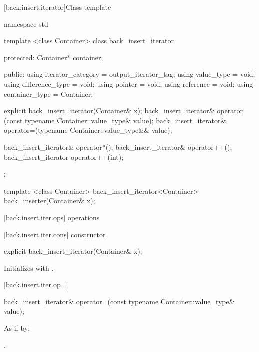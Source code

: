 [back.insert.iterator]{Class template }

%
\begin{codeblock}
namespace std {
  template <class Container>
  class back_insert_iterator {
  protected:
    Container* container;

  public:
    using iterator_category = output_iterator_tag;
    using value_type        = void;
    using difference_type   = void;
    using pointer           = void;
    using reference         = void;
    using container_type    = Container;

    explicit back_insert_iterator(Container& x);
    back_insert_iterator& operator=(const typename Container::value_type& value);
    back_insert_iterator& operator=(typename Container::value_type&& value);

    back_insert_iterator& operator*();
    back_insert_iterator& operator++();
    back_insert_iterator  operator++(int);
  };

  template <class Container>
    back_insert_iterator<Container> back_inserter(Container& x);
}
\end{codeblock}

[back.insert.iter.ops]{ operations}

[back.insert.iter.cons]{ constructor}

%
\begin{itemdecl}
explicit back_insert_iterator(Container& x);
\end{itemdecl}

\begin{itemdescr}
\pnum
\effects
Initializes
with .
\end{itemdescr}

[back.insert.iter.op=]{}

%
\begin{itemdecl}
back_insert_iterator& operator=(const typename Container::value_type& value);
\end{itemdecl}

\begin{itemdescr}
\pnum
\effects
As if by: 

\pnum
\returns
{}.
\end{itemdescr}

